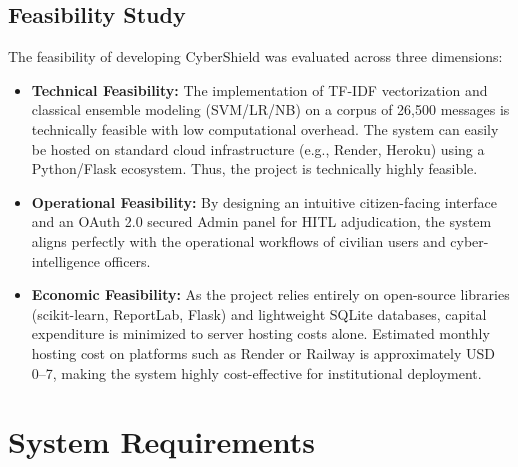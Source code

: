 \subsection{Feasibility Study}
The feasibility of developing CyberShield was evaluated across three dimensions:
\begin{itemize}
    \item \textbf{Technical Feasibility:} The implementation of TF-IDF vectorization and classical ensemble modeling (SVM/LR/NB) on a corpus of 26,500 messages is technically feasible with low computational overhead. The system can easily be hosted on standard cloud infrastructure (e.g., Render, Heroku) using a Python/Flask ecosystem. Thus, the project is technically highly feasible.
    \item \textbf{Operational Feasibility:} By designing an intuitive citizen-facing interface and an OAuth 2.0 secured Admin panel for HITL adjudication, the system aligns perfectly with the operational workflows of civilian users and cyber-intelligence officers.
    \item \textbf{Economic Feasibility:} As the project relies entirely on open-source libraries (scikit-learn, ReportLab, Flask) and lightweight SQLite databases, capital expenditure is minimized to server hosting costs alone. Estimated monthly hosting cost on platforms such as Render or Railway is approximately USD 0--7, making the system highly cost-effective for institutional deployment.
\end{itemize}


\section{System Requirements}

